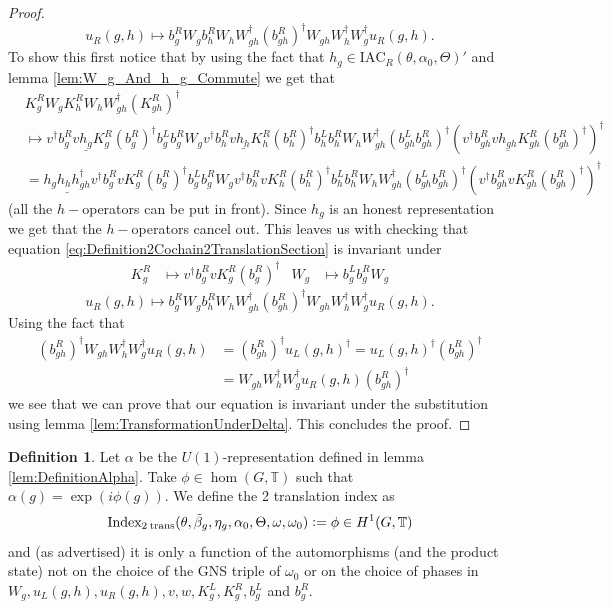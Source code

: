 \documentclass[12pt,a4paper,twoside]{article}
\newcommand{\IAC}{\textrm{IAC}}
\newcommand{\defeq}{\vcentcolon=}
\newcommand{\TT}{\mathbb T}
\theoremstyle{definition}
\newtheorem{definition}[theorem]{Definition}
\numberwithin{equation}{section}
\begin{document}
\begin{proof}
\begin{equation}
		u_R(g,h)\mapsto b_g^R W_g b_h^R W_h W_{gh}^\dagger (b_{gh}^R)^\dagger W_{gh}W_h^\dagger W_g^\dagger u_R(g,h).
	\end{equation}
	To show this first notice that by using the fact that $h_g\in\IAC_R(\theta,\alpha_0,\Theta)'$ and lemma \ref{lem:W_g_And_h_g_Commute} we get that
	\begin{align}
		&K_g^R W_g K_h^R W_ hW_{gh}^\dagger(K_{gh}^R)^\dagger\\
		&\mapsto v^\dagger b_g^R v \underline{h_g} K_g^R (b_g^R)^\dagger b_g^Lb_g^RW_g v^\dagger b_h^R v \underline{h_h} K_h^R (b_h^R)^\dagger b_h^Lb_h^RW_h W_{gh}^\dagger (b_{gh}^Lb_{gh}^R)^\dagger (v^\dagger b_{gh}^R v \underline{h_{gh}} K_{gh}^R (b_{gh}^R)^\dagger)^\dagger\\
		&=\underline{h_gh_hh_{gh}^\dagger} v^\dagger b_g^R v  K_g^R (b_g^R)^\dagger b_g^Lb_g^RW_g v^\dagger b_h^R v  K_h^R (b_h^R)^\dagger b_h^Lb_h^RW_h W_{gh}^\dagger (b_{gh}^Lb_{gh}^R)^\dagger (v^\dagger b_{gh}^R v  K_{gh}^R (b_{gh}^R)^\dagger)^\dagger
	\end{align}
	(all the $h-$operators can be put in front). Since $h_g$ is an honest representation we get that the $h-$operators cancel out. This leaves us with checking that equation \eqref{eq:Definition2Cochain2TranslationSection} is invariant under
	\begin{align}
		K_g^R&\mapsto v^\dagger b_g^R v K_g^R (b_g^R)^\dagger&W_g&\mapsto b_g^Lb_g^RW_g
	\end{align}
	\begin{equation}
		u_R(g,h)\mapsto b_g^R W_g b_h^R W_h W_{gh}^\dagger (b_{gh}^R)^\dagger W_{gh}W_h^\dagger W_g^\dagger u_R(g,h).
	\end{equation}
	Using the fact that
	\begin{align}
		(b_{gh}^R)^\dagger W_{gh}W_h^\dagger W_g^\dagger u_R(g,h)&=(b_{gh}^R)^\dagger u_L(g,h)^\dagger=u_L(g,h)^\dagger(b_{gh}^R)^\dagger\\
		&=W_{gh}W_h^\dagger W_g^\dagger u_R(g,h) (b_{gh}^R)^\dagger
	\end{align}
	we see that we can prove that our equation is invariant under the substitution using lemma \ref{lem:TransformationUnderDelta}. This concludes the proof.
\end{proof}
\begin{definition}
	Let $\alpha$ be the $U(1)$-representation defined in lemma \ref{lem:DefinitionAlpha}. Take $\phi\in\hom(G,\TT)$ such that $\alpha(g)=\exp(i\phi(g))$. We define the 2 translation index as
	\begin{equation}
		\textrm{Index}_{2\:\text{trans}}(\theta,\tilde{\beta}_g,\eta_g,\alpha_0,\Theta,\omega,\omega_0)\defeq \phi\in H^1(G,\TT)
	\end{equation}
	and (as advertised) it is only a function of the automorphisms (and the product state) not on the choice of the GNS triple of $\omega_0$ or on the choice of phases in $W_g,u_L(g,h),u_R(g,h),v,w,K^L_g,K^R_g,b^L_g$ and $b^R_g$.
\end{definition}
\end{document}
